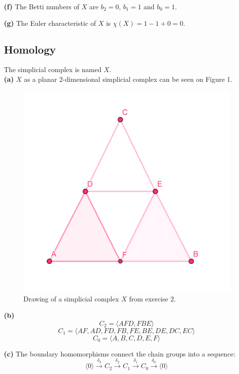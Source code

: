 \documentclass[12pt]{article}
\begin{document}
	\textbf{(f)} The Betti numbers of $X$ are $b_2=0$, $b_1=1$ and $b_0=1$.
	
	\textbf{(g)} The Euler characteristic of $X$ is $\chi(X)=1-1+0=0$.
	
	\subsection{Homology}
	
	The simplicial complex is named $X$. \\
	
	\textbf{(a)} $X$ as a planar 2-dimensional simplicial complex can be seen on Figure 1.
	
	\begin{figure}
		\centering
		\includegraphics[scale=0.20] {graf1}
		\caption{\label{fig:1} Drawing of a simplicial complex $X$ from exercise $2$. }
	\end{figure}
	
	\textbf{(b)} $$C_2 = \langle AFD, FBE \rangle $$
	$$C_1 = \langle AF, AD, FD, FB, FE, BE, DE, DC, EC \rangle $$
	$$C_0 = \langle A, B, C, D, E, F \rangle $$	
	
	
	\textbf{(c)}
	The boundary homomorphisms connect the chain groups into a sequence: 
	$$\langle 0 \rangle \xrightarrow{\text{$\delta_3$}} C_2 \xrightarrow{\text{$\delta_2$}} C_1 \xrightarrow{\text{$\delta_1$}} C_0  \xrightarrow{\text{$\delta_0$}} \langle 0 \rangle$$
	
\end{document}
